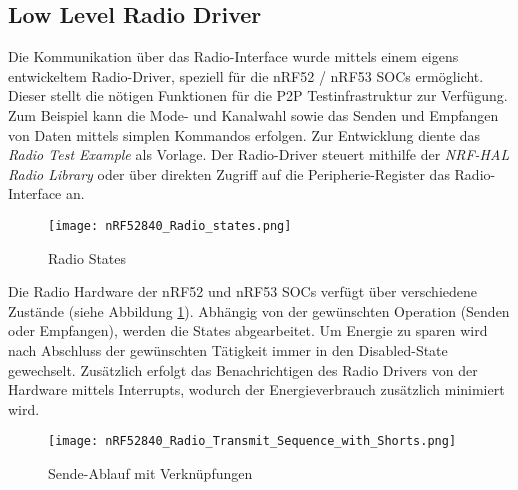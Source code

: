 
\subsection{Low Level Radio Driver}\label{sec:LowLevelRadioDriver}

Die Kommunikation über das Radio-Interface wurde mittels einem eigens entwickeltem Radio-Driver, speziell für die nRF52 / nRF53 SOCs ermöglicht. Dieser stellt die nötigen Funktionen für die P2P Testinfrastruktur zur Verfügung. Zum Beispiel kann die Mode- und Kanalwahl sowie das Senden und Empfangen von Daten mittels simplen Kommandos erfolgen. Zur Entwicklung diente das \textit{Radio Test Example} \cite{nrf_connect_sdk_radio_test_example_2020} als Vorlage. Der Radio-Driver steuert mithilfe der \textit{NRF-HAL Radio Library} oder über direkten Zugriff auf die Peripherie-Register das Radio-Interface an.

\begin{figure} [H]
	\centering
	\texttt{[image: nRF52840\_Radio\_states.png]}
	\caption{Radio States \cite{nordic_semi_nrf_infocenter_radio_states_2020}}
	\label{fig:RadioStatesP2P}
\end{figure}

Die Radio Hardware der nRF52 und nRF53 SOCs verfügt über verschiedene Zustände (siehe Abbildung \ref{fig:RadioStatesP2P}). Abhängig von der gewünschten Operation (Senden oder Empfangen), werden die States abgearbeitet. Um Energie zu sparen wird nach Abschluss der gewünschten Tätigkeit immer in den Disabled-State gewechselt. Zusätzlich erfolgt das Benachrichtigen des Radio Drivers von der Hardware mittels Interrupts, wodurch der Energieverbrauch zusätzlich minimiert wird.

\begin{figure} [H]
	\centering
	\texttt{[image: nRF52840\_Radio\_Transmit\_Sequence\_with\_Shorts.png]}
	\caption{Sende-Ablauf mit Verknüpfungen \cite{nordic_semi_nrf_infocenter_radio_transmit_sequence_2020}}
	\label{fig:RadioTransmitSequP2P}
\end{figure}

